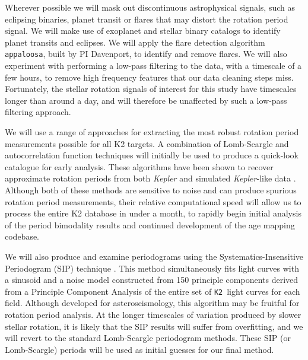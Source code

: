 \documentclass[12pt]{article}
\newcommand{\Kepler}{\textsl{Kepler}\xspace}
\newcommand{\ktwo}{{\tt K2}}
\begin{document}
Wherever possible we will mask out discontinuous astrophysical signals, such as
eclipsing binaries, planet transit or flares that may distort the rotation
period signal.
We will make use of exoplanet and stellar binary catalogs to identify planet transits
and eclipses.
We will apply the flare detection algorithm {\tt appaloosa}, built by PI
Davenport, to identify and remove flares.
We will also experiment with performing a low-pass filtering to the data, with a timescale of a few hours, to remove high frequency features that our data cleaning steps miss.
Fortunately, the stellar rotation signals of interest for this study
have timescales longer than around a day, and will therefore be unaffected by
such a low-pass filtering approach.

We will use a range of approaches for extracting the most robust rotation period measurements possible for all K2 targets. A combination of Lomb-Scargle and autocorrelation function
techniques will initially be used to produce a quick-look catalogue for early analysis. These algorithms have been shown to recover approximate rotation periods from both \Kepler and simulated \Kepler-like data \citep{aigrain2015}.
Although both of these methods are sensitive to noise and can produce spurious
rotation period measurements, their relative computational speed will allow us
to process the entire K2 database in under a month, to rapidly begin initial
analysis of the period bimodality results and continued development of the age
mapping codebase.

We will also produce and examine periodograms using the
Systematics-Insensitive Periodogram (SIP) technique \citep{angus2015}.
This method simultaneously fits light curves with a sinusoid and a noise
model constructed from 150 principle components derived from a Principle Component Analysis of the entire set of \ktwo\ light curves for each field.
Although developed for asteroseismology, this algorithm may be fruitful for rotation period analysis. At the longer timescales of variation produced by slower stellar rotation, it is likely that the SIP results will suffer from overfitting, and we will revert to the standard Lomb-Scargle periodogram methods. These SIP (or Lomb-Scargle) periods will be used as initial guesses for our final method.
\end{document}
